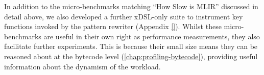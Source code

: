 In addition to the micro-benchmarks matching ``How Slow is MLIR'' discussed in detail above, we also developed a further xDSL-only suite to instrument key functions invoked by the pattern rewriter (Appendix \ref{}).
Whilst these micro-benchmarks are useful in their own right as performance measurements, they also facilitate further experiments. This is because their small size means they can be reasoned about at the bytecode level (\autoref{chap:profiling-bytecode}), providing useful information about the dynamism of the workload.





















